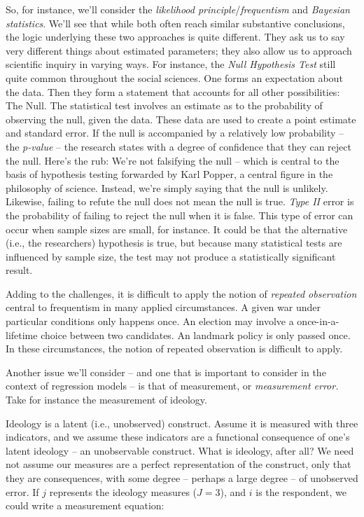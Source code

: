 \documentclass[
]{book}
\begin{document}
So, for instance, we'll consider the \emph{likelihood principle}/\emph{frequentism} and \emph{Bayesian statistics}. We'll see that while both often reach similar substantive conclusions, the logic underlying these two approaches is quite different. They ask us to say very different things about estimated parameters; they also allow us to approach scientific inquiry in varying ways. For instance, the \emph{Null Hypothesis Test} still quite common throughout the social sciences. One forms an expectation about the data. Then they form a statement that accounts for all other possibilities: The Null. The statistical test involves an estimate as to the probability of observing the null, given the data. These data are used to create a point estimate and standard error. If the null is accompanied by a relatively low probability -- the \emph{p-value} -- the research states with a degree of confidence that they can reject the null. Here's the rub: We're not falsifying the null -- which is central to the basis of hypothesis testing forwarded by Karl Popper, a central figure in the philosophy of science. Instead, we're simply saying that the null is unlikely. Likewise, failing to refute the null does not mean the null is true. \emph{Type II} error is the probability of failing to reject the null when it is false. This type of error can occur when sample sizes are small, for instance. It could be that the alternative (i.e., the researchers) hypothesis is true, but because many statistical tests are influenced by sample size, the test may not produce a statistically significant result.

Adding to the challenges, it is difficult to apply the notion of \emph{repeated observation} central to frequentism in many applied circumstances. A given war under particular conditions only happens once. An election may involve a once-in-a-lifetime choice between two candidates. An landmark policy is only passed once. In these circumstances, the notion of repeated observation is difficult to apply.

Another issue we'll consider -- and one that is important to consider in the context of regression models -- is that of measurement, or \emph{measurement error.} Take for instance the measurement of ideology.

Ideology is a latent (i.e., unobserved) construct. Assume it is measured with three indicators, and we assume these indicators are a functional consequence of one's latent ideology -- an unobservable construct. What is ideology, after all? We need not assume our measures are a perfect representation of the construct, only that they are consequences, with some degree -- perhaps a large degree -- of unobserved error. If \(j\) represents the ideology measures (\(J=3\)), and \(i\) is the respondent, we could write a measurement equation:
\end{document}
